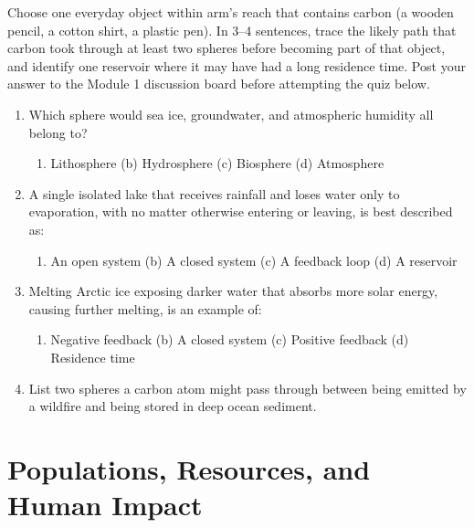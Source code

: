 \documentclass[11pt,a4paper]{scrreprt}
\begin{document}
\begin{activitybox}
Choose one everyday object within arm's reach that contains carbon (a wooden pencil, a cotton
shirt, a plastic pen). In 3--4 sentences, trace the likely path that carbon took through at least
two spheres before becoming part of that object, and identify one reservoir where it may have
had a long residence time. Post your answer to the Module 1 discussion board before attempting
the quiz below.
\end{activitybox}

\begin{quizbox}
\begin{enumerate}[label=\arabic*.]
  \item Which sphere would sea ice, groundwater, and atmospheric humidity all belong to?
  \begin{enumerate}[label=(\alph*)]
    \item Lithosphere \quad (b) Hydrosphere \quad (c) Biosphere \quad (d) Atmosphere
  \end{enumerate}
  \item A single isolated lake that receives rainfall and loses water only to evaporation, with
    no matter otherwise entering or leaving, is best described as:
  \begin{enumerate}[label=(\alph*)]
    \item An open system \quad (b) A closed system \quad (c) A feedback loop \quad (d) A reservoir
  \end{enumerate}
  \item Melting Arctic ice exposing darker water that absorbs more solar energy, causing further
    melting, is an example of:
  \begin{enumerate}[label=(\alph*)]
    \item Negative feedback \quad (b) A closed system \quad (c) Positive feedback \quad (d) Residence time
  \end{enumerate}
  \item List two spheres a carbon atom might pass through between being emitted by a wildfire and
    being stored in deep ocean sediment.
\end{enumerate}
\end{quizbox}

\chapter{Populations, Resources, and Human Impact}
\end{document}

